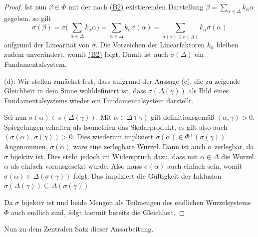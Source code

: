 \begin{proof}
  Ist nun $\beta \in \Phi$ mit der nach \hyperref[it:B2]{(B2)} existierenden Darstellung $\beta = \sum_{\alpha \in \Delta} k_\alpha \alpha$ gegeben, so gilt
  \begin{displaymath}
  \sigma(\beta) 
    = \sigma\Big(\,\sum_{\alpha \in \Delta} k_\alpha \alpha\Big)
    = \sum_{\alpha \in \Delta} k_\alpha \sigma(\alpha)
    = \sum_{\sigma(\alpha) \in \sigma(\Delta)} k_\alpha \sigma(\alpha)
  \end{displaymath}
  aufgrund der Linearität von $\sigma$.
  Die Vorzeichen der Linearfaktoren $k_\alpha$ bleiben zudem unverändert, womit \hyperref[it:B2]{(B2)} folgt.
  Damit ist auch $\sigma(\Delta)$ ein Fundamentalsystem.

  (d):
  Wir stellen zunächst fest, dass aufgrund der Aussage (c), die zu zeigende Gleichheit in dem Sinne wohldefiniert ist, dass $\sigma(\Delta(\gamma))$ als Bild eines Fundamentalsystems wieder ein Fundamentalsystem darstellt.

  Sei nun $\sigma(\alpha) \in \sigma(\Delta(\gamma))$.
  Mit $\alpha \in \Delta(\gamma)$ gilt definitionsgemäß $(\alpha, \gamma) > 0$.
  Spiegelungen erhalten als Isometrien das Skalarprodukt, es gilt also auch $(\sigma(\alpha), \sigma(\gamma)) > 0$.
  Dies wiederum impliziert $\sigma(\alpha) \in \Phi^+(\sigma(\gamma))$.
  Angenommen, $\sigma(\alpha)$ wäre eine zerlegbare Wurzel.
  Dann ist auch $\alpha$ zerlegbar, da $\sigma$ bijektiv ist.
  Dies steht jedoch im Widerspruch dazu, dass mit $\alpha \in \Delta$ die Wurzel $\alpha$ als einfach vorausgesetzt wurde.
  Also muss $\sigma(\alpha)$ auch einfach sein, womit $\sigma(\alpha) \in \Delta(\sigma(\gamma))$ folgt.
  Das impliziert die Gültigkeit der Inklusion $\sigma(\Delta(\gamma)) \subseteq \Delta(\sigma(\gamma))$.
  
  Da $\sigma$ bijektiv ist und beide Mengen als Teilmengen des endlichen Wurzelsystems $\Phi$ auch endlich sind, folgt hiermit bereits die Gleichheit.
\end{proof}

Nun zu dem Zentralen Satz dieser Ausarbeitung.

